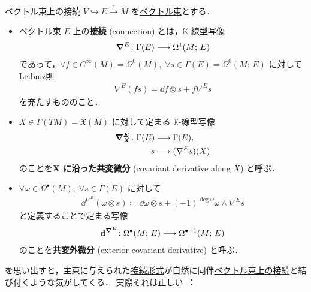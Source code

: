 \documentclass[TQFT_main]{subfiles}
\begin{document}
\begin{mydef}[label=def:connection-vect]{ベクトル束上の接続}
    $V \hookrightarrow  E \xrightarrow{\pi} M$ を\hyperref[def:vect]{ベクトル束}とする．
    \begin{itemize}
        \item ベクトル束 $E$ 上の\textbf{接続} (connection) とは，$\mathbb{K}$-線型写像
        \begin{align}
            \bm{\nabla^E} \colon \Gamma(E) \longrightarrow \Omega^1(M;\, E)
        \end{align}
        であって，$\forall f \in C^\infty (M) = \Omega^0 (M),\; \forall s \in \Gamma(E) = \Omega^0 (M;\, E)$ に対してLeibniz則
        \begin{align}
            \nabla^E (fs) = \dd{f} \otimes s + f \nabla^E s
        \end{align}
        を充たすもののこと．
        \item $X \in \Gamma (TM) = \mathfrak{X}(M)$ に対して定まる $\mathbb{K}$-線型写像
        \begin{align}
            \bm{\nabla^E_X} \colon \Gamma(E) &\longrightarrow \Gamma(E), \\
            s &\longmapsto (\nabla^E s)(X)
        \end{align}
        のことを\textbf{$\bm{X}$ に沿った共変微分} (covariant derivative along $X$) と呼ぶ．
        \item $\forall \omega \in \Omega^\bullet(M),\; \forall s \in \Gamma(E)$ に対して
        \begin{align}
            \dd^{\nabla^E}(\omega \otimes s) \coloneqq \dd{\omega} \otimes s + (-1)^{\deg \omega} \omega \wedge \nabla^E s
        \end{align}
        と定義することで定まる写像
        \begin{align}
            \bm{\mathrm{d}^{\nabla^E}} \colon \Omega^\bullet (M;\, E) \longrightarrow \Omega^{\bullet+1} (M;\, E)
        \end{align}
        のことを\textbf{共変外微分} (exterior covariant derivative) と呼ぶ．
    \end{itemize}
\end{mydef}

を思い出すと，主束に与えられた\hyperref[def:connection]{接続形式}が自然に同伴\hyperref[def:connection-vect]{ベクトル束上の接続}と結び付くような気がしてくる．
実際それは正しい~\cite[p.150, 命題6.3.3]{Imai2013diff}：
\end{document}
